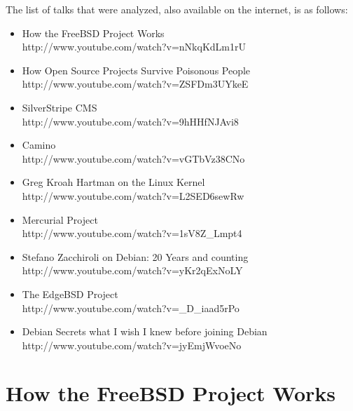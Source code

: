 \documentclass[11pt]{article} %
\begin{document}
The list of talks that were analyzed, also available on the internet, is as follows:

\begin{itemize}
  \item How the FreeBSD Project Works\\
  		http://www.youtube.com/watch?v=nNkqKdLm1rU
  \item How Open Source Projects Survive Poisonous People\\
  		http://www.youtube.com/watch?v=ZSFDm3UYkeE
  \item SilverStripe CMS\\
  		http://www.youtube.com/watch?v=9hHHfNJAvi8
  \item Camino\\
  		http://www.youtube.com/watch?v=vGTbVz38CNo
  \item Greg Kroah Hartman on the Linux Kernel\\
  		http://www.youtube.com/watch?v=L2SED6sewRw
  \item Mercurial Project\\
  		http://www.youtube.com/watch?v=1sV8Z\_Lmpt4
  \item Stefano Zacchiroli on Debian: 20 Years and counting\\
  		http://www.youtube.com/watch?v=yKr2qExNoLY
  \item The EdgeBSD Project\\
  		http://www.youtube.com/watch?v=\_D\_iaad5rPo
  \item Debian Secrets what I wish I knew before joining Debian\\
  		http://www.youtube.com/watch?v=jyEmjWvoeNo
\end{itemize}

\newpage





\section{How the FreeBSD Project Works}
\end{document}
